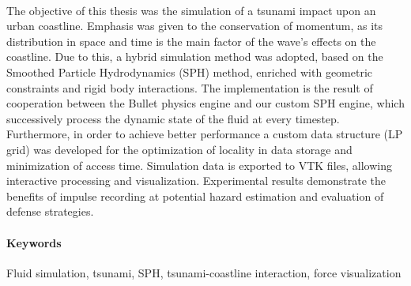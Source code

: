 \paragraph{} The objective of this thesis was the simulation of a tsunami impact upon an
urban coastline. Emphasis was given to the conservation of momentum, as its distribution
in space and time is the main factor of the wave's effects on the coastline. Due to this,
a hybrid simulation method was adopted, based on the Smoothed Particle Hydrodynamics (SPH)
method, enriched with geometric constraints and rigid body interactions. The
implementation is the result of cooperation between the Bullet physics engine and our
custom SPH engine, which successively process the dynamic state of the fluid at every
timestep. Furthermore, in order to achieve better performance a custom data structure (LP
grid) was developed for the optimization of locality in data storage and minimization of
access time. Simulation data is exported to VTK files, allowing interactive processing and
visualization. Experimental results demonstrate the benefits of impulse recording at
potential hazard estimation and evaluation of defense strategies.

\paragraph{Keywords} Fluid simulation, tsunami, SPH, tsunami-coastline interaction, force
visualization

